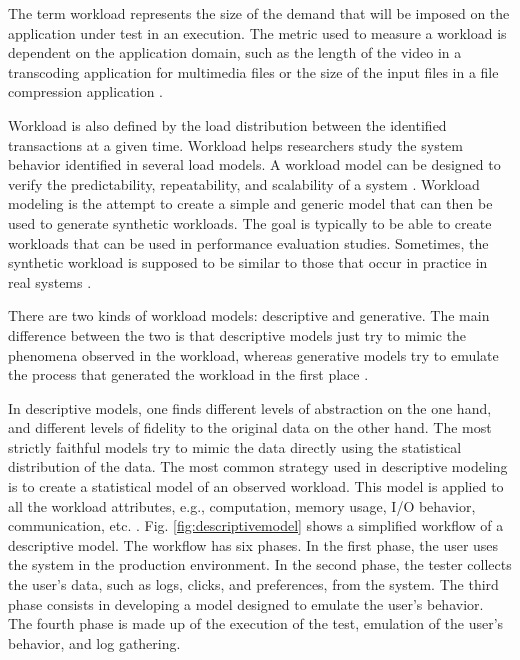 \documentclass[espaco=umemeio,chapter=TITLE,twoside,openright]{abnt}
\begin{document}
The term workload represents the size of the demand that will be imposed on the application under test in an execution. The metric  used to measure a workload is dependent on the application domain, such as the length of the video in a transcoding application for multimedia files or the size of the input files in a file compression application \cite{Feitelson2013} \cite{Molyneaux2009} \cite{Goncalves2014}.

Workload is also defined by the load distribution between the identified transactions at a given time. Workload helps researchers study the system behavior identified in several load models. A workload model can be designed to verify the predictability, repeatability, and scalability of a system \cite{Feitelson2013} \cite{Molyneaux2009}. Workload modeling is the attempt to create a simple and generic model that can then be used to generate synthetic workloads. The goal is typically to be able to create workloads that can be used in performance evaluation studies. Sometimes, the synthetic workload is supposed to be similar to those that occur in practice in real systems \cite{Feitelson2013} \cite{Molyneaux2009}.

There are two kinds of workload models: descriptive and generative. The main difference between the two is that descriptive models just try to mimic the phenomena observed in the workload, whereas generative models try to emulate the process that generated the workload in the first place \cite{Feitelson2013}.

In descriptive models, one finds different levels of abstraction on the one hand, and different levels of fidelity to the original data on the other hand. The most strictly faithful models try to mimic the data directly using the statistical distribution of the data. The most common strategy used in descriptive modeling is to create a statistical model of an observed workload. This model is applied to all the workload attributes, e.g., computation, memory usage, I/O behavior, communication, etc. \cite{Feitelson2013}. Fig. \ref{fig:descriptivemodel} shows a simplified workflow of a descriptive model. The workflow has six phases. In the first phase, the user uses the system in the production environment. In the second phase, the tester collects the user's data, such as logs, clicks, and preferences, from the system. The third phase consists in developing a model designed to emulate the user's behavior. The fourth phase is made up of the execution of the test, emulation of the user's behavior, and log gathering.
\end{document}
